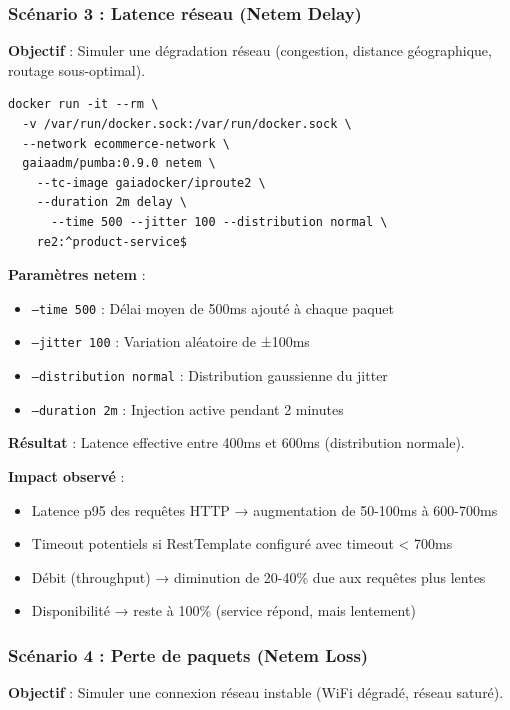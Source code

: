 \subsubsection{Scénario 3 : Latence réseau (Netem Delay)}

\textbf{Objectif} : Simuler une dégradation réseau (congestion, distance géographique, routage sous-optimal).

\begin{lstlisting}[caption={Commande Pumba - Latence 500ms ±100ms}]
docker run -it --rm \
  -v /var/run/docker.sock:/var/run/docker.sock \
  --network ecommerce-network \
  gaiaadm/pumba:0.9.0 netem \
    --tc-image gaiadocker/iproute2 \
    --duration 2m delay \
      --time 500 --jitter 100 --distribution normal \
    re2:^product-service$
\end{lstlisting}

\textbf{Paramètres netem} :
\begin{itemize}
    \item \texttt{--time 500} : Délai moyen de 500ms ajouté à chaque paquet
    \item \texttt{--jitter 100} : Variation aléatoire de ±100ms
    \item \texttt{--distribution normal} : Distribution gaussienne du jitter
    \item \texttt{--duration 2m} : Injection active pendant 2 minutes
\end{itemize}

\textbf{Résultat} : Latence effective entre 400ms et 600ms (distribution normale).

\textbf{Impact observé} :
\begin{itemize}
    \item Latence p95 des requêtes HTTP → augmentation de 50-100ms à 600-700ms
    \item Timeout potentiels si RestTemplate configuré avec timeout < 700ms
    \item Débit (throughput) → diminution de 20-40\% due aux requêtes plus lentes
    \item Disponibilité → reste à 100\% (service répond, mais lentement)
\end{itemize}

\subsubsection{Scénario 4 : Perte de paquets (Netem Loss)}

\textbf{Objectif} : Simuler une connexion réseau instable (WiFi dégradé, réseau saturé).

